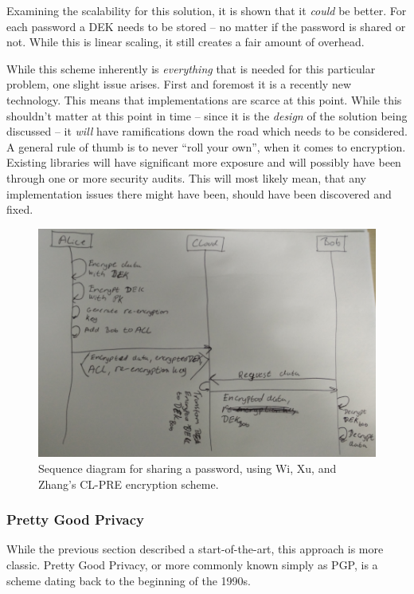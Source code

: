 				Examining the scalability for this solution, it is shown that it \emph{could} be better. For each password a DEK needs to be stored -- no matter if the password is shared or not. While this is linear scaling, it still creates a fair amount of overhead.

				While this scheme inherently is \emph{everything} that is needed for this particular problem, one slight issue arises. First and foremost it is a recently new technology. This means that implementations are scarce at this point. While this shouldn't matter at this point in time -- since it is the \emph{design} of the solution being discussed -- it \emph{will} have ramifications down the road which needs to be considered. A general rule of thumb is to never ``roll your own'', when it comes to encryption. Existing libraries will have significant more exposure and will possibly have been through one or more security audits. This will most likely mean, that any implementation issues there might have been, should have been discovered and fixed.

				\begin{figure}[h!]
					\centering
					\includegraphics[width=\textwidth]{figures/design/sequence_cl-pre_small.png}
					\caption{Sequence diagram for sharing a password, using Wi, Xu, and Zhang's CL-PRE encryption scheme\cite{Wu:2011:PCP:2046707.2093514}.}
					\label{fig:sequence:cl-pre}
				\end{figure}

			\subsubsection{Pretty Good Privacy}
				While the previous section described a start-of-the-art, this approach is more classic. Pretty Good Privacy, or more commonly known simply as PGP, is a scheme dating back to the beginning of the 1990s. 

